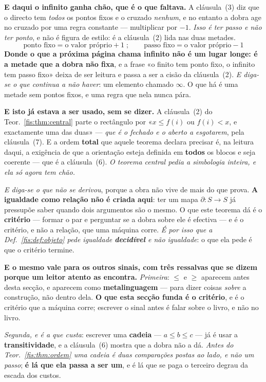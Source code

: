 \documentclass[livro.tex]{subfiles}
\begin{document}
\medskip\noindent\textbf{E daqui o infinito ganha chão, que é o que faltava.} A
cláusula~(3) diz que o directo tem \emph{todos} os pontos fixos e o cruzado
\emph{nenhum}, e no entanto a dobra age no cruzado por uma regra constante ---
multiplicar por $-1$. \emph{Isso é ter passo e não ter ponto}, e não é figura de
estilo: é a cláusula~(2) lida nas duas metades.
\[
\boxed{\;\text{ponto fixo}=\text{o valor próprio}+1\;;\qquad
\text{passo fixo}=\text{o valor próprio}-1\;}
\]
\textbf{Donde o que a próxima página chama infinito não é um lugar longe: é a
metade que a dobra não fixa}, e a frase «o finito tem ponto fixo, o infinito tem
passo fixo» deixa de ser leitura e passa a ser a cisão da cláusula~(2). \emph{E
diga-se o que continua a não haver}: um elemento chamado $\infty$. O que há é
uma metade sem pontos fixos, e uma regra que nela nunca pára.

\medskip\noindent\textbf{E isto já estava a ser usado, sem se dizer.} A
cláusula~(2) do Teor.~\ref{fis:thm:central} parte o rectângulo por
«$x\le f(i)$ ou $f(i)<x$, e exactamente uma das duas» --- \emph{que é o fechado e
o aberto a esgotarem}, pela cláusula~(7). E a ordem \textbf{total} que aquele
teorema declara precisar é, na leitura daqui, a exigência de que a orientação
esteja definida em \textbf{todos} os blocos e seja coerente --- que é a
cláusula~(6). \emph{O teorema central pedia a simbologia inteira, e ela só agora
tem chão.}

\medskip\noindent\emph{E diga-se o que não se derivou}, porque a obra não vive de
mais do que prova. \textbf{A igualdade como relação não é criada aqui}: ter um
mapa $\partial\colon S\to S$ já pressupõe saber quando dois argumentos são o
mesmo. O que este teorema dá é o \textbf{critério} --- formar o par e perguntar
se a dobra sobre ele é efectiva --- e é o critério, e não a relação, que uma
máquina corre. \emph{É por isso que a Def.~\ref{fis:def:objeto} pede igualdade
\textbf{decidível} e não igualdade}: o que ela pede é que o critério termine.

\medskip\noindent\textbf{E o mesmo vale para os outros sinais, com três ressalvas
que se dizem porque um leitor atento as encontra.} \emph{Primeira}: $\le$ e $\ge$
aparecem antes desta secção, e aparecem como \textbf{metalinguagem} --- para dizer
coisas \emph{sobre} a construção, não dentro dela. \textbf{O que esta secção funda
é o critério}, e é o critério que a máquina corre; escrever o sinal antes é falar
sobre o livro, e não no livro.

\emph{Segunda, e é a que custa}: escrever uma \textbf{cadeia} --- $a\le b\le c$ ---
já é usar a \textbf{transitividade}, e a cláusula~(6) mostra que a dobra não a dá.
\emph{Antes do Teor.~\ref{fis:thm:ordem} uma cadeia é duas comparações postas ao
lado, e não um passo}; \textbf{é lá que ela passa a ser um}, e é lá que se paga o
terceiro degrau da escada dos custos.
\end{document}
